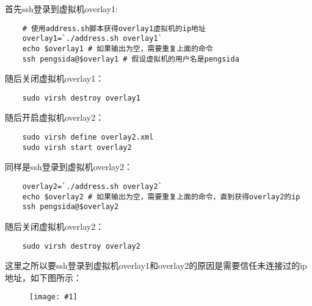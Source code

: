\documentclass[a4paper,left=1.5cm,right=1.5cm,11pt]{article}
\newcommand{\fic}[1]{\begin{figure}[H]
		\center
		\texttt{[image: \#1]}
	\end{figure}}
\begin{document}
	首先ssh登录到虚拟机overlay1:
	\begin{lstlisting}
	# 使用address.sh脚本获得overlay1虚拟机的ip地址
	overlay1=`./address.sh overlay1`
	echo $overlay1 # 如果输出为空，需要重复上面的命令
	ssh pengsida@$overlay1 # 假设虚拟机的用户名是pengsida
	\end{lstlisting}

	随后关闭虚拟机overlay1：
	\begin{lstlisting}
	sudo virsh destroy overlay1
	\end{lstlisting}

	随后开启虚拟机overlay2：
	\begin{lstlisting}
	sudo virsh define overlay2.xml
	sudo virsh start overlay2
	\end{lstlisting}

	同样是ssh登录到虚拟机overlay2：
	\begin{lstlisting}
	overlay2=`./address.sh overlay2`
	echo $overlay2 # 如果输出为空，需要重复上面的命令，直到获得overlay2的ip
	ssh pengsida@$overlay2
	\end{lstlisting}

	随后关闭虚拟机overlay2：
	\begin{lstlisting}
	sudo virsh destroy overlay2
	\end{lstlisting}

	这里之所以要ssh登录到虚拟机overlay1和overlay2的原因是需要信任未连接过的ip地址，如下图所示：
	\fic{1.png}
\end{document}
